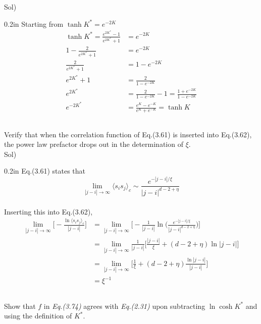 \documentclass[paper=a4, fontsize=11pt]{scrartcl}
\numberwithin{equation}{section}
\numberwithin{figure}{section}
\numberwithin{table}{section}
\newcommand{\expval}[1]{\langle #1 \rangle}
\newenvironment{problem}{\subsection{}}{}
\newenvironment{solution}{Sol) \begin{adjustwidth}{0.2in}{}\vspace{0.1in}}{\end{adjustwidth}}
\begin{document}
\begin{solution}
	Starting from $\tanh K^* = e^{-2K}$ \\[3pt]
	\begin{equation}
		\begin{split}
		\tanh K^* = \frac{e^{2K^*}-1}{e^{2K^*}+1} &=  e^{-2K} \\
		1 - \frac{2}{e^{2K^*}+1} &= e^{-2K} \\
		 \frac{2}{e^{2K^*}+1} &= 1- e^{-2K} \\
		 e^{2K^*}+1 &= \frac{2}{1- e^{-2K}} \\
		 e^{2K^*} &= \frac{2}{1- e^{-2K}} -1 = \frac{1+ e^{-2K}}{1- e^{-2K}} \\
		 e^{-2K^*} &= \frac{e^{K}- e^{-K}}{e^{K}+ e^{-K}} = \tanh K
		\end{split}
	\end{equation}
\end{solution}

\vskip 0.3in

\begin{problem}
	 Verify that when the correlation function of  Eq.(3.61) is inserted into Eq.(3.62), the power law prefactor drops out in the determination of $\xi$.
\end{problem}\\

\begin{solution}
	Eq.(3.61) states that \\[3pt]
	\begin{equation}
		\lim_{|j-i|\to\infty} \expval{s_i s_j}_c \sim \frac{e^{-|j-i|/ \xi}}{|j-i|^{d-2+\eta}}
	\end{equation}\\[3pt]
	Inserting this into Eq.(3.62),\\[3pt]
	\begin{equation}
		\begin{split}
		\lim_{|j-i|\to\infty} \bigg[ -\frac{\ln \expval{s_i s_j}_c}{|j-i|} \bigg] &=  \lim_{|j-i|\to\infty} \bigg[ - \frac{1}{|j-i|} \ln\bigg(\frac{e^{-|j-i|/ \xi}}{|j-i|^{d-2+\eta}}\bigg)\bigg] \\[5pt]
		&=  \lim_{|j-i|\to\infty} \frac{1}{|j-i|} \bigg[ \frac{|j-i|}{\xi} + (d-2+\eta) \ln |j-i|\bigg] \\[5pt]
		&= \lim_{|j-i|\to\infty} \bigg[ \frac{1}{\xi} + (d-2+\eta) \frac{\ln |j-i|}{|j-i|} \bigg] \\[5pt]
		&= \xi^{-1}
		\end{split} 
	\end{equation}
\end{solution}
\vskip 0.3in
\begin{problem}
	Show that $f$ in \textit{Eq.(3.74)} agrees with \textit{Eq.(2.31)} upon subtracting $\ln \cosh K^*$ and using the definition of $K^*$.
\end{problem}\\
\end{document}
